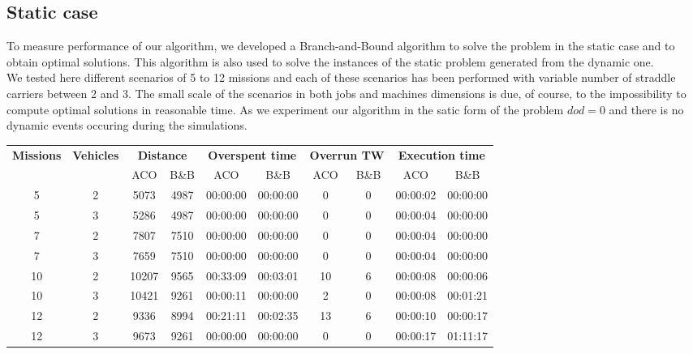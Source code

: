 \documentclass[a4paper,10pt]{article}
\begin{document}
	\subsection{Static case}
  To measure performance of our algorithm, we developed a Branch-and-Bound algorithm to solve the problem in the static case and to obtain optimal solutions. This algorithm is also used to solve the instances of the static problem generated from the dynamic one.\\

  We tested here different scenarios of 5 to 12 missions and each of these scenarios has been performed with variable number of straddle carriers between 2 and 3. The small scale of the scenarios in both jobs and machines dimensions is due, of course, to the impossibility to compute optimal solutions in reasonable time.
  As we experiment our algorithm in the satic form of the problem $dod=0$ and there is no dynamic events occuring during the simulations.

  \small
  \begin{center}
    \begin{tabular}{|c|c|c|c|c|c|c|c|c|c|} 
    \hline
      \multirow{2}{*}{\bf{Missions}} & \multirow{2}{*}{\bf{Vehicles}} & \multicolumn{2}{|c|}{\bf{Distance}} & \multicolumn{2}{|c|}{\bf{Overspent time}} & \multicolumn{2}{|c|}{\bf{Overrun TW}} &  \multicolumn{2}{|c|}{\bf{Execution time}} \\\cline{3-10}
		 &	& ACO 	& B\&B	& ACO	& B\&B		& ACO		& B\&B	& ACO		& B\&B\\ \hline
	5	 & 2 	& 5073	& 4987	& 00:00:00	& 00:00:00 	& 0	& 0	& 00:00:02	& 00:00:00\\
	5	 & 3 	& 5286	& 4987	& 00:00:00	& 00:00:00	& 0	& 0	& 00:00:04	& 00:00:00\\
	7	 & 2	& 7807	& 7510	& 00:00:00	& 00:00:00	& 0	& 0	& 00:00:04	& 00:00:00\\
	7	 & 3	& 7659	& 7510	& 00:00:00	& 00:00:00	& 0	& 0	& 00:00:04	& 00:00:00\\
	10	 & 2	& 10207	& 9565	& 00:33:09	& 00:03:01	& 10	& 6	& 00:00:08	& 00:00:06\\
	10	 & 3	& 10421	& 9261	& 00:00:11	& 00:00:00	& 2	& 0	& 00:00:08	& 00:01:21\\
	12	 & 2	& 9336	& 8994	& 00:21:11	& 00:02:35	& 13	& 6	& 00:00:10	& 00:00:17\\
	12	 & 3	& 9673	& 9261	& 00:00:00	& 00:00:00	& 0	& 0	& 00:00:17	& 01:11:17\\
      \hline
    \end{tabular}
  \end{center}
  \normalsize
\end{document}
